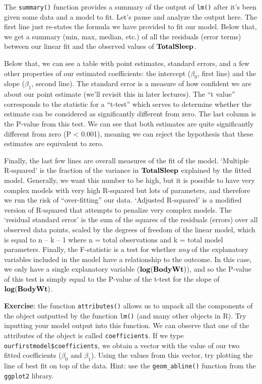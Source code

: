 \documentclass[
]{book}
\begin{document}
The \texttt{summary()} function provides a summary of the output of \texttt{lm()} after it's been given some data and a model to fit. Let's pause and analyze the output here. The first line just re-states the formula we have provided to fit our model. Below that, we get a summary (min, max, median, etc.) of all the residuals (error terms) between our linear fit and the observed values of \(\bf{TotalSleep}\).

Below that, we can see a table with point estimates, standard errors, and a few other properties of our estimated coefficients: the intercept (\(\beta_0\), first line) and the slope (\(\beta_1\), second line). The standard error is a measure of how confident we are about our point estimate (we'll revisit this in later lectures). The ``t value'' corresponds to the statistic for a ``t-test'' which serves to determine whether the estimate can be considered as significantly different from zero. The last column is the P-value from this test. We can see that both estimates are quite significantly different from zero (P \textless{} 0.001), meaning we can reject the hypothesis that these estimates are equivalent to zero.

Finally, the last few lines are overall measures of the fit of the model. `Multiple R-squared' is the fraction of the variance in \(\bf{TotalSleep}\) explained by the fitted model. Generally, we want this number to be high, but it is possible to have very complex models with very high R-squared but lots of parameters, and therefore we run the risk of ``over-fitting'' our data. `Adjusted R-squared' is a modified version of R-squared that attempts to penalize very complex models. The `residual standard error' is the sum of the squares of the residuals (errors) over all observed data points, scaled by the degrees of freedom of the linear model, which is equal to n -- k -- 1 where n = total observations and k = total model parameters. Finally, the F-statistic is a test for whether \emph{any} of the explanatory variables included in the model have a relationship to the outcome. In this case, we only have a single explanatory variable (\(\bf{log(BodyWt)}\)), and so the P-value of this test is simply equal to the P-value of the t-test for the slope of \(\bf{log(BodyWt)}\).

\textbf{Exercise}: the function \texttt{attributes()} allows us to unpack all the components of the object outputted by the function \texttt{lm()} (and many other objects in R). Try inputting your model output into this function. We can observe that one of the attributes of the object is called \texttt{coefficients}. If we type \texttt{ourfirstmodel\$coefficients}, we obtain a vector with the value of our two fitted coefficients (\(\beta_0\) and \(\beta_1\)). Using the values from this vector, try plotting the line of best fit on top of the data. Hint: use the \texttt{geom\_abline()} function from the \texttt{ggplot2} library.
\end{document}
